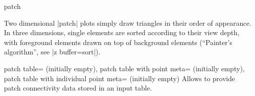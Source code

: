 {\begin{plottype}[/pgfplots]{patch}
\begin{codeexample}[]
\end{codeexample}
	
	Two dimensional |patch| plots simply draw triangles in their order of appearance. In three dimensions, single elements are sorted according to their view depth, with foreground elements drawn on top of background elements (``Painter's algorithm'', see |z buffer=sort|).

\begin{pgfplotskeylist}{%
	patch table= (initially empty),%
	patch table with point meta= (initially empty),%
	patch table with individual point meta= (initially empty)%
}
	Allows to provide patch connectivity data stored in an input table.


\end{pgfplotskeylist}
\end{plottype}}
